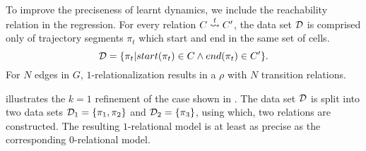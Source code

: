 
To improve the preciseness of learnt dynamics, we include the
reachability relation in the
regression. For every relation $C\overset{t}{\rightsquigarrow}C'$, the data set $\mathcal{D}$ is
comprised only of trajectory segments $\pi_t$ which start and end in
the same set of cells.
\[
    \mathcal{D} = \{\pi_t | start(\pi_t) \in C \land end(\pi_t) \in C'\}.
\]
For $N$ edges in $G$, $1$-relationalization results in a $\rho$ with
$N$ transition relations.

 illustrates the $k=1$ refinement of the case shown in
. The data set $\mathcal{D}$ is split into two data sets $\mathcal{D}_1
= \{\pi_1, \pi_2\}$ and $\mathcal{D}_2 = \{\pi_3\}$, using which, two
relations are constructed. The resulting $1$-relational model
is at least as precise as the corresponding $0$-relational model.


